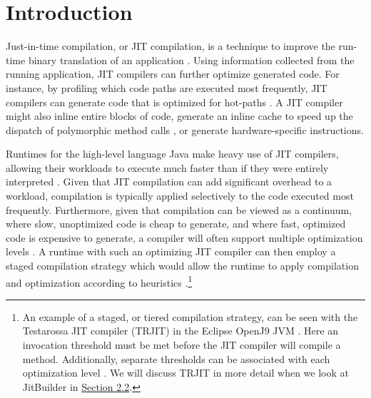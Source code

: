 \section{Introduction}
\label{sec:introduction}
Just-in-time compilation, or JIT compilation, is a technique to improve the run-time binary translation of an application \cite{Aycock:2003:BHJ:857076.857077}.
Using information collected from the running application, JIT compilers can further optimize generated code.
For instance, by profiling which code paths are executed most frequently, JIT compilers can generate code that is optimized for hot-paths \cite{Smith:2005:VMV:1204009}.
A JIT compiler might also inline entire blocks of code, generate an inline cache to speed up the dispatch of polymorphic method calls \cite{picPaper}, or generate hardware-specific instructions.

Runtimes for the high-level language Java make heavy use of JIT compilers, allowing their workloads to execute much faster than if they were entirely interpreted \cite{HiPerfJava}.
Given that JIT compilation can add significant overhead to a workload, compilation is typically applied selectively to the code executed most frequently.
Furthermore, given that compilation can be viewed as a continuum, where slow, unoptimized code is cheap to generate, and where fast, optimized code is expensive to generate, a compiler will often support multiple optimization levels \cite{Smith:2005:VMV:1204009}.
A runtime with such an optimizing JIT compiler can then employ a staged compilation strategy which would allow the runtime to apply compilation and optimization according to heuristics \cite{dynamo}.\footnote{
    An example of a staged, or tiered compilation strategy, can be seen with the Testarossa JIT compiler (TRJIT) in the Eclipse OpenJ9 JVM \cite{eclipseOMR,TRJITOptimize}.
    Here an invocation threshold must be met before the JIT compiler will compile a method.
    Additionally, separate thresholds can be associated with each optimization level \cite{TRJitLevels}.
    We will discuss TRJIT in more detail when we look at JitBuilder in \hyperref[sec:jitbuilder]{Section 2.2}.}

